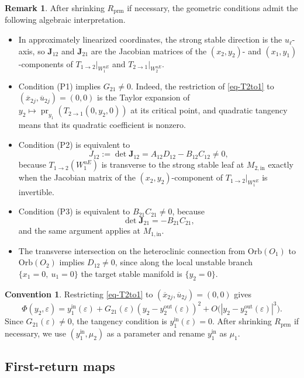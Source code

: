 \documentclass[11pt,a4paper]{article}
\theoremstyle{plain}
\theoremstyle{definition}
\newtheorem{remark}[theorem]{Remark}
\newtheorem{convention}[theorem]{Convention}
\theoremstyle{plain}
\numberwithin{equation}{section}
\begin{document}
\begin{remark}
\label{rem-gcmeaning}
After shrinking $R_\mathrm{prm}$ if necessary, the geometric conditions admit the following algebraic interpretation.
\begin{itemize}
\item In approximately linearized coordinates, the strong stable direction is the $u_\ell$-axis, so $\mathbf{J}_{12}$ and $\mathbf{J}_{21}$ are the Jacobian matrices of the $(x_2,y_2)$- and $(x_1,y_1)$-components of $T_{1 \to 2}|_{W_1^{uE}}$ and $T_{2 \to 1}|_{W_2^{uE}}$.
\item Condition \textup{(P1)} implies $G_{21} \neq 0$. Indeed, the restriction of \eqref{eq-T2to1} to $(\overline{x}_{2j},\overline{u}_{2j}) = (0,0)$ is the Taylor expansion of $y_2 \longmapsto \operatorname{pr}_{y_1}(T_{2 \to 1}(0,y_2,0))$ at its critical point, and quadratic tangency means that its quadratic coefficient is nonzero.
\item Condition \textup{(P2)} is equivalent to
\[
J_{12} := \det \mathbf{J}_{12} = A_{12}D_{12} - B_{12}C_{12} \neq 0,
\]
because $T_{1 \to 2}(W_1^{uE})$ is transverse to the strong stable leaf at $M_{2,\mathrm{in}}$ exactly when the Jacobian matrix of the $(x_2,y_2)$-component of $T_{1 \to 2}|_{W_1^{uE}}$ is invertible.
\item Condition \textup{(P3)} is equivalent to $B_{21}C_{21} \neq 0$, because
\[
\det \mathbf{J}_{21} = -B_{21}C_{21},
\]
and the same argument applies at $M_{1,\mathrm{in}}$.
\item The transverse intersection on the heteroclinic connection from $\mathrm{Orb}(O_1)$ to $\mathrm{Orb}(O_2)$ implies $D_{12} \neq 0$, since along the local unstable branch $\{x_1 = 0,\ u_1 = 0\}$ the target stable manifold is $\{y_2 = 0\}$.
\end{itemize}
\end{remark}

\begin{convention}
\label{conv-repmu1}
Restricting \eqref{eq-T2to1} to $(\overline{x}_{2j},\overline{u}_{2j}) = (0,0)$ gives
\[
\Phi(y_2,\varepsilon)
=
y_1^\mathrm{in}(\varepsilon)
+
G_{21}(\varepsilon)(y_2 - y_2^\mathrm{out}(\varepsilon))^2
+
O\bigl(|y_2 - y_2^\mathrm{out}(\varepsilon)|^3\bigr).
\]
Since $G_{21}(\varepsilon) \neq 0$, the tangency condition is $y_1^\mathrm{in}(\varepsilon) = 0$. After shrinking $R_\mathrm{prm}$ if necessary, we use $(y_1^\mathrm{in},\mu_2)$ as a parameter and rename $y_1^\mathrm{in}$ as $\mu_1$.
\end{convention}
\subsection{First-return maps}
\end{document}
